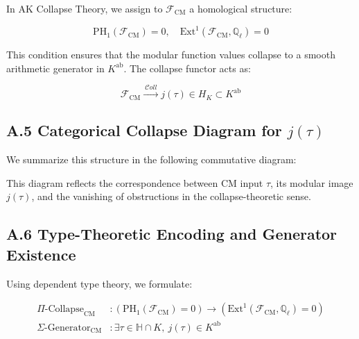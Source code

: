 \documentclass[11pt]{article}
\begin{document}
In AK Collapse Theory, we assign to \( \mathcal{F}_{\mathrm{CM}} \) a homological structure:

\[
\mathrm{PH}_1(\mathcal{F}_{\mathrm{CM}}) = 0, \quad \mathrm{Ext}^1(\mathcal{F}_{\mathrm{CM}}, \mathbb{Q}_\ell) = 0
\]

This condition ensures that the modular function values collapse to a smooth arithmetic generator in \( K^{\mathrm{ab}} \). The collapse functor acts as:

\[
\mathcal{F}_{\mathrm{CM}} \xrightarrow{\ \mathcal{C}oll\ } j(\tau) \in H_K \subset K^{\mathrm{ab}}
\]

\subsection*{A.5 Categorical Collapse Diagram for \( j(\tau) \)}

We summarize this structure in the following commutative diagram:

\begin{center}
\end{center}

This diagram reflects the correspondence between CM input \( \tau \), its modular image \( j(\tau) \), and the vanishing of obstructions in the collapse-theoretic sense.

\subsection*{A.6 Type-Theoretic Encoding and Generator Existence}

Using dependent type theory, we formulate:

\begin{align*}
\Pi\text{-Collapse}_{\mathrm{CM}} &\colon \left( \mathrm{PH}_1(\mathcal{F}_{\mathrm{CM}}) = 0 \right) \rightarrow \left( \mathrm{Ext}^1(\mathcal{F}_{\mathrm{CM}}, \mathbb{Q}_\ell) = 0 \right) \\
\Sigma\text{-Generator}_{\mathrm{CM}} &\colon \exists \tau \in \mathbb{H} \cap K,\ j(\tau) \in K^{\mathrm{ab}}
\end{align*}
\end{document}
